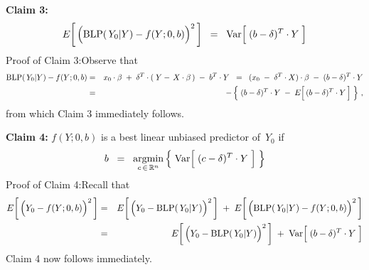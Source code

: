 
\vskip 0.5cm
\noindent
\textbf{Claim 3:}
\begin{equation*}
E\!\left[\,\left(\blp(\,Y_{0}\vert Y) \overset{{\color{white}.}}{-} f(Y;0,b)\right)^{2}\,\right]
\;\; = \;\;
	\Var\!\left[\;(b \overset{{\color{white}.}}{-} \delta)^{T}\cdot Y\;\right]
\end{equation*}
Proof of Claim 3:\quad Observe that
\begin{eqnarray*}
\blp(\,Y_{0}\vert Y) - f(Y;0,b)
&=&
	x_{0}\cdot\beta \; + \; \delta^{T}\cdot(\;Y - \,X\cdot\beta\,) \; - \; b^{T} \cdot Y
\;\; = \;\;
	(x_{0} \; - \; \delta^{T} \cdot X) \cdot \beta \; - \; (b - \delta)^{T} \cdot Y
\\
&=&
	- \left\{\;
		(b - \delta)^{T} \cdot Y \; - \; E\!\left[\,(b \overset{{\color{white}.}}{-} \delta)^{T} \cdot Y\,\right]
		 \;\right\}\,,
\end{eqnarray*}
from which Claim 3 immediately follows.

\vskip 0.5cm
\noindent
\textbf{Claim 4:}\quad
$f(Y;0,b)$ is a best linear unbiased predictor of \,$Y_{0}$ if
\begin{equation*}
b \;\; = \;\;
	\underset{c\,\in\,\Re^{n}}{\textnormal{argmin}}
	\left\{\;
		\Var\!\left[\;(c \overset{{\color{white}.}}{-} \delta)^{T}\cdot Y\;\right]
		\;\right\}
\end{equation*}
Proof of Claim 4:\quad Recall that
\begin{eqnarray*}
E\!\left[\,\left(Y_{0} \overset{{\color{white}.}}{-} f(Y;0,b)\right)^{2}\,\right]
& = &
	E\!\left[\,\left(Y_{0} \overset{{\color{white}.}}{-} \blp(\,Y_{0}\vert Y)\right)^{2}\,\right]
	\; + \;
	E\!\left[\,\left(\blp(\,Y_{0}\vert Y) \overset{{\color{white}.}}{-} f(Y;0,b)\right)^{2}\,\right]
\\
& = &
	E\!\left[\,\left(Y_{0} \overset{{\color{white}.}}{-} \blp(\,Y_{0}\vert Y)\right)^{2}\,\right]
	\; + \;
	\Var\!\left[\;(b \overset{{\color{white}.}}{-} \delta)^{T}\cdot Y\;\right]
\end{eqnarray*}
Claim 4 now follows immediately.

